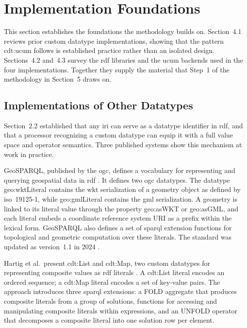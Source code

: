 \chapter{Implementation Foundations}

This section establishes the foundations the methodology builds on. Section~4.1 reviews
prior custom datatype implementations, showing that the pattern \textsf{cdt:ucum} follows
is established practice rather than an isolated design. Sections~4.2 and~4.3 survey the
\ac{rdf} libraries and the \ac{ucum} backends used in the four implementations. Together
they supply the material that Step~1 of the methodology in Section~5 draws on.


\section{Implementations of Other Datatypes}

Section~2.2 established that any \ac{iri} can serve as a datatype identifier in \ac{rdf},
and that a processor recognizing a custom datatype can equip it with a full value space and
operator semantics. Three published systems show this mechanism at work in practice.

GeoSPARQL, published by the \ac{ogc}, defines a vocabulary for representing and querying
geospatial data in \ac{rdf} \cite{perry2012geosparql}. It defines two \ac{ogc} datatypes.
The datatype \textsf{geo:wktLiteral} contains the \ac{wkt} serialization of a geometry
object as defined by \ac{iso}~19125-1, while \textsf{geo:gmlLiteral} contains the \ac{gml}
serialization. A geometry is linked to its literal value through the property
\textsf{geo:asWKT} or \textsf{geo:asGML}, and each literal embeds a coordinate reference
system URI as a prefix within the lexical form. GeoSPARQL also defines a set of \ac{sparql}
extension functions for topological and geometric computation over these literals. The
standard was updated as version~1.1 in 2024 \cite{car2024geosparql}.

Hartig et al.\ present \textsf{cdt:List} and \textsf{cdt:Map}, two custom datatypes for
representing composite values as \ac{rdf} literals \cite{hartig2024datatypes}. A
\textsf{cdt:List} literal encodes an ordered sequence; a \textsf{cdt:Map} literal encodes
a set of key-value pairs. The approach introduces three \ac{sparql} extensions: a FOLD
aggregate that produces composite literals from a group of solutions, functions for accessing
and manipulating composite literals within expressions, and an UNFOLD operator that
decomposes a composite literal into one solution row per element.

